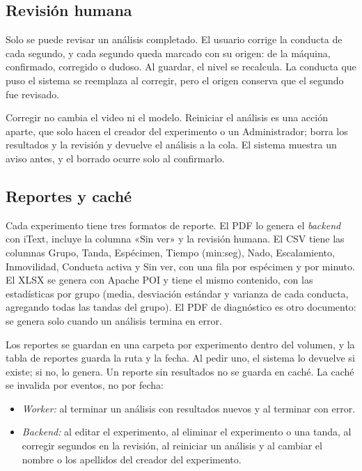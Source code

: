 \subsection{Revisión humana}

Solo se puede revisar un análisis completado. El usuario corrige la conducta de cada segundo, y cada segundo queda
marcado con su origen: de la máquina, confirmado, corregido o dudoso. Al guardar, el nivel se recalcula. La conducta
que puso el sistema se reemplaza al corregir, pero el origen conserva que el segundo fue revisado.

Corregir no cambia el video ni el modelo. Reiniciar el análisis es una acción aparte, que solo hacen el creador del
experimento o un Administrador; borra los resultados y la revisión y devuelve el análisis a la cola. El sistema muestra
un aviso antes, y el borrado ocurre solo al confirmarlo.

\subsection{Reportes y caché}

Cada experimento tiene tres formatos de reporte. El PDF lo genera el \textit{backend} con iText, incluye la columna «Sin ver» y la revisión
humana. El CSV tiene las columnas Grupo, Tanda, Espécimen, Tiempo (min:seg), Nado, Escalamiento, Inmovilidad,
Conducta activa y Sin ver, con una fila por espécimen y por minuto. El XLSX se genera con Apache POI y tiene el mismo
contenido, con las estadísticas por grupo (media, desviación estándar y varianza de cada conducta, agregando todas
las tandas del grupo). El PDF de diagnóstico es otro documento: se genera solo cuando un análisis termina en error.

Los reportes se guardan en una carpeta por experimento dentro del volumen, y la tabla de reportes guarda la ruta y la
fecha. Al pedir uno, el sistema lo devuelve si existe; si no, lo genera. Un reporte sin resultados no se guarda en caché.
La caché se invalida por eventos, no por fecha:

\begin{itemize}
  \item \textit{Worker:} al terminar un análisis con resultados nuevos y al terminar con error.
  \item \textit{Backend:} al editar el experimento, al eliminar el experimento o una tanda, al corregir segundos en la
  revisión, al reiniciar un análisis y al cambiar el nombre o los apellidos del creador del experimento.
\end{itemize}

